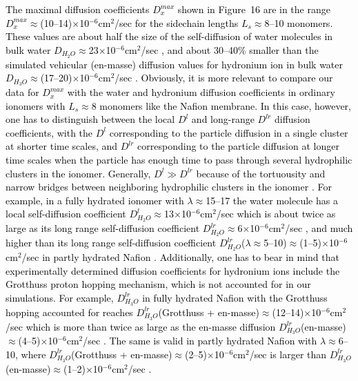 \documentclass[3p,english,preprint]{elsarticle}
\newcommand{\need}[1]{\textcolor{black}{#1}}
\newcommand{\mage}[1]{\textcolor{black}{#1}}
\begin{document}
{\need{ 
The maximal diffusion coefficients $D_x^{max}$ shown in Figure~16 are in the range 
$D_x^{max}$$\approx$(10--14)$\times$10$^{-6}$cm$^2$/sec for the   
sidechain lengths $L_s$$\approx$8--10 monomers. These values 
 are about half the size of 
 the self-diffusion of water molecules in bulk water
 $D_{H_2O}$$\approx$23$\times$10$^{-6}$cm$^2$/sec   
\cite{perrin-2007,choi2005,kerisit-2009,kreuer-2004-review,krynicki-1978-water-self-diffusion,agmon-1995-water-grotthuss}, 
and about 30--40\% smaller than the simulated vehicular (en-masse) diffusion values for hydronium ion in bulk water
    $D_{H_3O}$$\approx$(17--20)$\times$10$^{-6}$cm$^2$/sec \cite{li-2001-partial-charges,choi2005}.  
Obviously, it is  more relevant  to compare our data for $D_x^{max}$ with the water and  hydronium diffusion 
coefficients in ordinary ionomers with $L_s$$\approx$8 monomers
 like the Nafion membrane. In this case, however,  one has to distinguish 
between the local $D^l$ and long-range $D^{lr}$ diffusion coefficients, with the $D^l$ corresponding to the particle 
diffusion in a single cluster at shorter time scales, and 
$D^{lr}$ corresponding to the particle diffusion at longer time scales when the particle has enough time to
pass through several hydrophilic clusters in the ionomer. Generally, 
$D^{l} \gg D^{lr}$ because of the tortuousity and narrow bridges between neighboring 
hydrophilic clusters in the ionomer \cite{zawod-1995}. 
For example,  in a  fully hydrated ionomer with $\lambda$$\approx$15--17 the water molecule has a local self-diffusion coefficient  
  $D_{H_2O}^l$$\approx$13$\times$10$^{-6}$cm$^2$/sec  which is about twice 
as large as  its  long range self-diffusion coefficient $D_{H_2O}^{lr}$$\approx$6$\times$10$^{-6}$cm$^2$/sec  
 \cite{perrin-2006},  and much higher than its  long range self-diffusion coefficient
  $D_{H_2O}^{lr}$($\lambda$$\approx$5--10)$\approx$(1--5)$\times$10$^{-6}$cm$^2$/sec 
in partly  hydrated Nafion \cite{eikerling-2008,cui-2008}.
Additionally, one has to bear in mind that 
experimentally determined diffusion coefficients for hydronium ions  
include the Grotthuss proton hopping mechanism,   which is not accounted for in our simulations. 
 For example, $D_{H_3O}^{lr}$ in  fully hydrated Nafion with the Grotthuss hopping accounted for reaches  
 $D_{H_3O}^{lr}$(Grotthuss + en-masse)$\approx$(12--14)$\times$10$^{-6}$cm$^2$/sec \cite{li-2001-partial-charges}
which is more than twice as large as  the en-masse diffusion  
 $D_{H_3O}^{lr}$(en-masse)$\approx$(4--5)$\times$10$^{-6}$cm$^2$/sec \cite{li-2001-partial-charges,sun-2015-md-simulation-diffusion}. 
The same is valid in partly hydrated Nafion with $\lambda$$\approx$6--10, where 
 $D_{H_3O}^{lr}$(Grotthuss + en-masse)$\approx$(2--5)$\times$10$^{-6}$cm$^2$/sec 
is larger than 
 $D_{H_3O}^{lr}$(en-masse)$\approx$(1--2)$\times$10$^{-6}$cm$^2$/sec \cite{perrin-2007,cui-2008}.
}}
\end{document}
